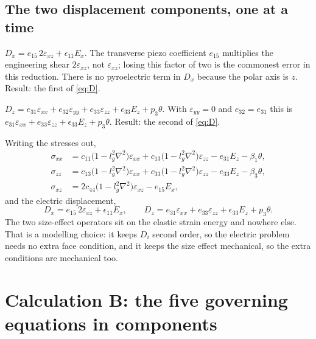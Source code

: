 \documentclass[11pt]{article}
\makeatletter
\newif\ifshowworked
\newenvironment{worked}{%
  \ifshowworked\par\smallskip\noindent\textit{Working.}\par\smallskip\else
  \setbox\z@\vbox\bgroup\fi}{\ifshowworked\par\smallskip\else\egroup\fi}
\makeatother
\begin{document}
\subsection*{The two displacement components, one at a time}

\begin{worked}
$D_x=e_{15}\,2\varepsilon_{xz}+\epsilon_{11}E_x$. The transverse piezo coefficient $e_{15}$ multiplies
the engineering shear $2\varepsilon_{xz}$, not $\varepsilon_{xz}$; losing this factor of two is the
commonest error in this reduction. There is no pyroelectric term in $D_x$ because the polar axis is $z$.
Result: the first of \eqref{eq:D}.
\end{worked}

\begin{worked}
$D_z=e_{31}\varepsilon_{xx}+e_{32}\varepsilon_{yy}+e_{33}\varepsilon_{zz}+\epsilon_{33}E_z+p_3\theta$.
With $\varepsilon_{yy}=0$ and $e_{32}=e_{31}$ this is $e_{31}\varepsilon_{xx}+e_{33}\varepsilon_{zz}
+\epsilon_{33}E_z+p_3\theta$. Result: the second of \eqref{eq:D}.
\end{worked}

Writing the stresses out,
\begin{align}\label{eq:stress}
\sigma_{xx}&=c_{11}\bigl(1-l_g^2\nabla^2\bigr)\varepsilon_{xx}
+c_{13}\bigl(1-l_g^2\nabla^2\bigr)\varepsilon_{zz}-e_{31}E_z-\beta_1\theta,\\
\sigma_{zz}&=c_{13}\bigl(1-l_g^2\nabla^2\bigr)\varepsilon_{xx}
+c_{33}\bigl(1-l_g^2\nabla^2\bigr)\varepsilon_{zz}-e_{33}E_z-\beta_3\theta,\\
\sigma_{xz}&=2c_{44}\bigl(1-l_g^2\nabla^2\bigr)\varepsilon_{xz}-e_{15}E_x,
\end{align}
and the electric displacement,
\begin{equation}\label{eq:D}
D_x=e_{15}\,2\varepsilon_{xz}+\epsilon_{11}E_x,\qquad
D_z=e_{31}\varepsilon_{xx}+e_{33}\varepsilon_{zz}+\epsilon_{33}E_z+p_3\theta .
\end{equation}
The two size-effect operators sit on the elastic strain energy and nowhere else. That is a modelling
choice: it keeps $D_i$ second order, so the electric problem needs no extra face condition, and it keeps
the size effect mechanical, so the extra conditions are mechanical too.

\section{Calculation B: the five governing equations in components}\label{sec:calcB}
\end{document}
